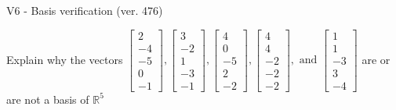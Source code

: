 \begin{exercise}
  \begin{exerciseTitle}V6 - Basis verification (ver. 476)\end{exerciseTitle}
  \begin{exerciseStatement}
    Explain why the vectors \(\left[\begin{array}{r}
2 \\
-4 \\
-5 \\
0 \\
-1
\end{array}\right] , \left[\begin{array}{r}
3 \\
-2 \\
1 \\
-3 \\
-1
\end{array}\right] , \left[\begin{array}{r}
4 \\
0 \\
-5 \\
2 \\
-2
\end{array}\right] , \left[\begin{array}{r}
4 \\
4 \\
-2 \\
-2 \\
-2
\end{array}\right] , \text{ and } \left[\begin{array}{r}
1 \\
1 \\
-3 \\
3 \\
-4
\end{array}\right]\) are or are not a basis of \(\mathbb{R}^5\)	



\end{exerciseStatement}
\end{exercise}
